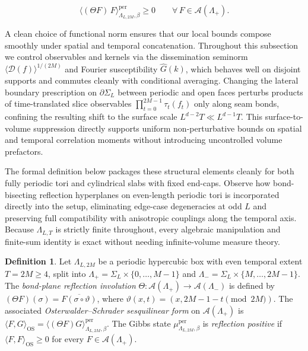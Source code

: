 \documentclass[11pt]{article}
\theoremstyle{definition}
\newtheorem{definition}[theorem]{Definition}
\begin{document}
\[
  \langle (\Theta F) \, F \rangle_{\Lambda_{L,2M},\beta}^{\mathrm{per}} \ge 0 \qquad \forall \, F \in \mathcal{A}(\Lambda_+).
\]

A clean choice of functional norm ensures that our local bounds compose smoothly
under spatial and temporal concatenation. Throughout this subsection we control
observables and kernels via the dissemination seminorm $\langle \mathcal{D}(f)
\rangle^{1/(2M)}$ and Fourier susceptibility $\widehat{G}(k)$, which behaves well on
disjoint supports and commutes cleanly with conditional averaging. Changing the
lateral boundary prescription on $\partial \Sigma_L$ between periodic and open faces
perturbs products of time-translated slice observables $\prod_{t=0}^{2M-1}
\tau_t(f_t)$ only along seam bonds, confining the resulting shift to the surface
scale $L^{d-2} T \ll L^{d-1} T$. This surface-to-volume suppression directly
supports uniform non-perturbative bounds on spatial and temporal correlation moments
without introducing uncontrolled volume prefactors.

The formal definition below packages these structural elements cleanly for both
fully periodic tori and cylindrical slabs with fixed end-caps. Observe how
bond-bisecting reflection hyperplanes on even-length periodic tori is incorporated
directly into the setup, eliminating edge-case degeneracies at odd $L$ and
preserving full compatibility with anisotropic couplings along the temporal axis.
Because $\Lambda_{L,T}$ is strictly finite throughout, every algebraic manipulation
and finite-sum identity is exact without needing infinite-volume measure theory.

\begin{definition}
\label{def:s06-reflection}
Let $\Lambda_{L, 2M}$ be a periodic hypercubic box with even temporal extent $T = 2M
\ge 4$, split into $\Lambda_+ = \Sigma_L \times \{0, \dots, M-1\}$ and $\Lambda_- =
\Sigma_L \times \{M, \dots, 2M-1\}$. The \emph{bond-plane reflection involution}
$\Theta : \mathcal{A}(\Lambda_+) \to \mathcal{A}(\Lambda_-)$ is defined by $(\Theta
F)(\sigma) = \overline{F(\sigma \circ \vartheta)}$, where $\vartheta(x, t) = (x, 2M
- 1 - t \pmod{2M})$. The associated \emph{Osterwalder--Schrader sesquilinear form}
on $\mathcal{A}(\Lambda_+)$ is $\langle F, G \rangle_{\mathrm{OS}} = \langle (\Theta
F) G \rangle_{\Lambda_{L,2M},\beta}^{\mathrm{per}}$. The Gibbs state
$\mu_{\Lambda_{L,2M},\beta}^{\mathrm{per}}$ is \emph{reflection positive} if
$\langle F, F \rangle_{\mathrm{OS}} \ge 0$ for every $F \in \mathcal{A}(\Lambda_+)$.
\end{definition}
\end{document}
